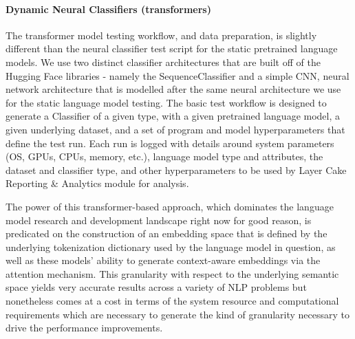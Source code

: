 \documentclass[final]{clv2025}
\begin{document}
\paragraph{Dynamic Neural Classifiers (transformers)}

The transformer model testing workflow, and data preparation, is slightly different than the neural classifier test script for the static pretrained language models. We use two distinct classifier architectures that are built off of the Hugging Face libraries - namely the SequenceClassifier and a simple CNN, neural network architecture that is modelled after the same neural architecture we use for the static language model testing. The basic test workflow is designed to generate a Classifier of a given type, with a given pretrained language model, a given underlying dataset, and a set of program and model hyperparameters that define the test run. Each run is logged with details around system parameters (OS, GPUs, CPUs, memory, etc.), language model type and attributes, the dataset and classifier type, and other hyperparameters to be used by Layer Cake Reporting \& Analytics module for analysis.

The power of this transformer-based approach, which dominates the language model research and development landscape right now for good reason, is predicated on the construction of an embedding space that is defined by the underlying tokenization dictionary used by the language model in question, as well as these models’ ability to generate context-aware embeddings via the attention mechanism. This granularity with respect to the underlying semantic space yields very accurate results across a variety of NLP problems but nonetheless comes at a cost in terms of the system resource and computational requirements which are necessary to generate the kind of granularity necessary to drive the performance improvements. 
\end{document}
